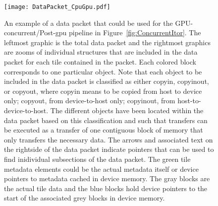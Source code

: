 \documentclass{article}
\begin{document}
\begin{figure}[!hp]
\begin{center}
\texttt{[image: DataPacket\_CpuGpu.pdf]}
\caption[]{An example of a data packet that could be used for the
GPU-concurrent/Post-gpu pipeline in Figure~\ref{fig:ConcurrentItor}.  The
leftmost graphic is the total data packet and the rightmost graphics are zooms
of individual structures that are included in the data packet for each tile
contained in the packet.  Each
colored block corresponds to one particular object.  Note that
each object to be included in the data packet is classified as either copyin,
copyinout, or copyout, where copyin means to be copied from host to device only;
copyout, from device-to-host only; copyinout, from host-to-device-to-host.
The different objects have been located within the data packet based on this
classification and such that transfers can be executed as a transfer of one
contiguous block of memory that only transfers the necessary data.  The arrows
and associated text
on the rightside of the data packet indicate pointers that can be used to find
inidividual subsections of the data packet.  The green tile metadata elements
could be the actual metadata itself or device pointers to metadata cached in
device memory.  The gray blocks are the actual tile data and the blue blocks
hold device pointers to the start of the associated grey blocks in device
memory.}
\label{fig:DataPacket_CpuGpu}
\end{center}
\end{figure}
\end{document}
